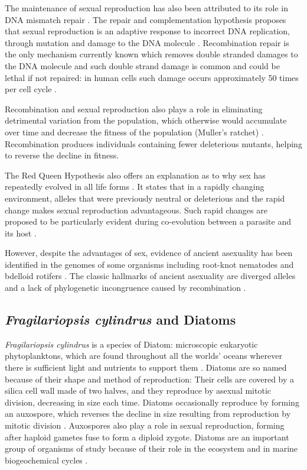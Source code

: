 The maintenance of sexual reproduction has also been attributed to its role in DNA mismatch repair \parencite{Bernstein2011}.
The repair and complementation hypothesis proposes that sexual reproduction is an adaptive response to incorrect DNA replication, through mutation and damage to the DNA molecule \parencite{Bernstein1984,Bernstein1985,Bernstein1987}.
Recombination repair is the only mechanism currently known which removes double stranded damages to the DNA molecule and such double strand damage is common and could be lethal if not repaired: in human cells such damage occurs approximately 50 times per cell cycle \parencite{Vilenchik2003}.

Recombination and sexual reproduction also plays a role in eliminating detrimental variation from the population, which otherwise would accumulate over time and decrease the fitness of the population (Muller's ratchet) \parencite{Muller1932}.
Recombination produces individuals containing fewer deleterious mutants, helping to reverse the decline in fitness.

The Red Queen Hypothesis also offers an explanation as to why sex has repeatedly evolved in all life forms \parencite{Paterson2010}.
It states that in a rapidly changing environment, alleles that were previously neutral or deleterious and the rapid change makes sexual reproduction advantageous. 
Such rapid changes are proposed to be particularly evident during co-evolution between a parasite and its host \parencite{Decaestecker2007}.

However, despite the advantages of sex, evidence of ancient asexuality has been identified in the genomes of some organisms including root-knot nematodes and bdelloid rotifers \parencite{Lunt2008,MarkWelch2000,Meselson2007a,Pouchkina-Stantcheva2007}.
The classic hallmarks of ancient asexuality are diverged alleles and a lack of phylogenetic incongruence caused by recombination \parencite{Schurko2009}.


\subsection{\textit{Fragilariopsis cylindrus} and Diatoms}

\textit{Fragilariopsis cylindrus} is a species of Diatom: microscopic eukaryotic phytoplanktons, which are found throughout all the worlds’ oceans wherever there is sufficient light and nutrients to support them \parencite{Armbrust2009}.
Diatoms are so named because of their shape and method of reproduction: Their cells are covered by a silica cell wall made of two halves, and they reproduce by asexual mitotic division, decreasing in size each time.
Diatoms occasionally reproduce by forming an auxospore, which reverses the decline in size resulting from reproduction by mitotic division \parencite{Armbrust2009}.
Auxospores also play a role in sexual reproduction, forming after haploid gametes fuse to form a diploid zygote.
Diatoms are an important group of organisms of study because of their role in the ecosystem and in marine biogeochemical cycles \parencite{Assmy2013,Thomas2002,Pondaven2000}.

